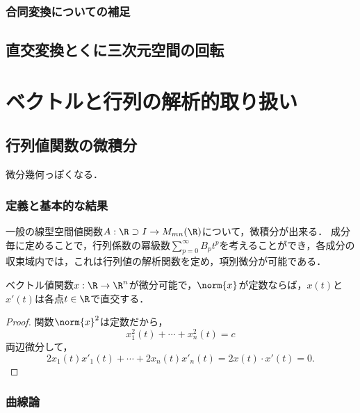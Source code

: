 \documentclass[uplatex, dvipdfmx]{jsreport}
\begin{document}
\subsection{合同変換についての補足}

\section{直交変換とくに三次元空間の回転}

\chapter{ベクトルと行列の解析的取り扱い}

\section{行列値関数の微積分}

\begin{tcolorbox}[colframe=ForestGreen, colback=ForestGreen!10!white,breakable,colbacktitle=ForestGreen!40!white,coltitle=black,fonttitle=\bfseries\sffamily,
title=]
    微分幾何っぽくなる．
\end{tcolorbox}

\subsection{定義と基本的な結果}

一般の線型空間値関数$A:\R\supset I\to M_{mn}(\R)$について，微積分が出来る．
成分毎に定めることで，行列係数の冪級数$\sum_{p=0}^\infty B_pt^p$を考えることができ，各成分の収束域内では，これは行列値の解析関数を定め，項別微分が可能である．

\begin{lemma}
    ベクトル値関数$x:\R\to\R^n$が微分可能で，$\norm{x}$が定数ならば，$x(t)$と$x'(t)$は各点$t\in\R$で直交する．
\end{lemma}
\begin{proof}
    関数$\norm{x}^2$は定数だから，
    \[x_1^2(t)+\cdots+x_n^2(t)=c\]
    両辺微分して，
    \[2x_1(t)x'_1(t)+\cdots+2x_n(t)x'_n(t)=2x(t)\cdot x'(t)=0.\]
\end{proof}

\subsection{曲線論}
\end{document}
